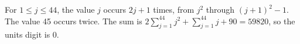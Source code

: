 For $1\le j\le44$, the value $j$ occurs $2j+1$ times, from $j^2$ through $(j+1)^2-1$. The value 45 occurs twice. The sum is $2\sum_{j=1}^{44}j^2+\sum_{j=1}^{44}j+90=59820$, so the units digit is $\boxed0$.
